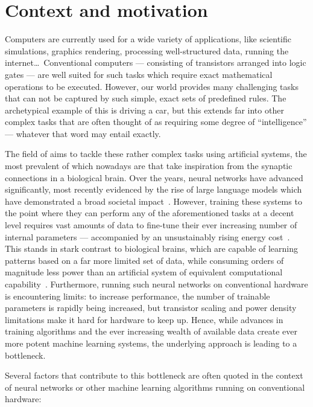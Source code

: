 \section{Context and motivation}\label{sec:1:Context}
Computers are currently used for a wide variety of applications, like scientific simulations, graphics rendering, processing well-structured data, running the internet\dots\,
Conventional computers --- consisting of transistors arranged into logic gates --- are well suited for such tasks which require exact mathematical operations to be executed.
However, our world provides many challenging tasks that can not be captured by such simple, exact sets of predefined rules.
The archetypical example of this is driving a car, but this extends far into other complex tasks that are often thought of as requiring some degree of ``intelligence'' --- whatever that word may entail exactly. \par
The field of  aims to tackle these rather complex tasks using artificial systems, the most prevalent of which nowadays are  that take inspiration from the synaptic connections in a biological brain.
Over the years, neural networks have advanced significantly, most recently evidenced by the rise of large language models which have demonstrated a broad societal impact~\cite{ImprovingLanguageGPT,GPT-4}.
However, training these systems to the point where they can perform any of the aforementioned tasks at a decent level requires vast amounts of data to fine-tune their ever increasing number of internal parameters --- accompanied by an unsustainably rising energy cost~\cite{QuantumNeuromorphicOpportunities,BLOOM_CarbonFootprint_176Bparam}.
This stands in stark contrast to biological brains, which are capable of learning patterns based on a far more limited set of data, while consuming orders of magnitude less power than an artificial system of equivalent computational capability~\cite{NeuromorphicSpintronics}.
Furthermore, running such neural networks on conventional hardware is encountering limits: to increase performance, the number of trainable parameters is rapidly being increased, but transistor scaling and power density limitations make it hard for hardware to keep up. %
Hence, while advances in training algorithms and the ever increasing wealth of available data create ever more potent machine learning systems, the underlying approach is leading to a bottleneck. \par
Several factors that contribute to this bottleneck are often quoted in the context of neural networks or other machine learning algorithms running on conventional hardware:
